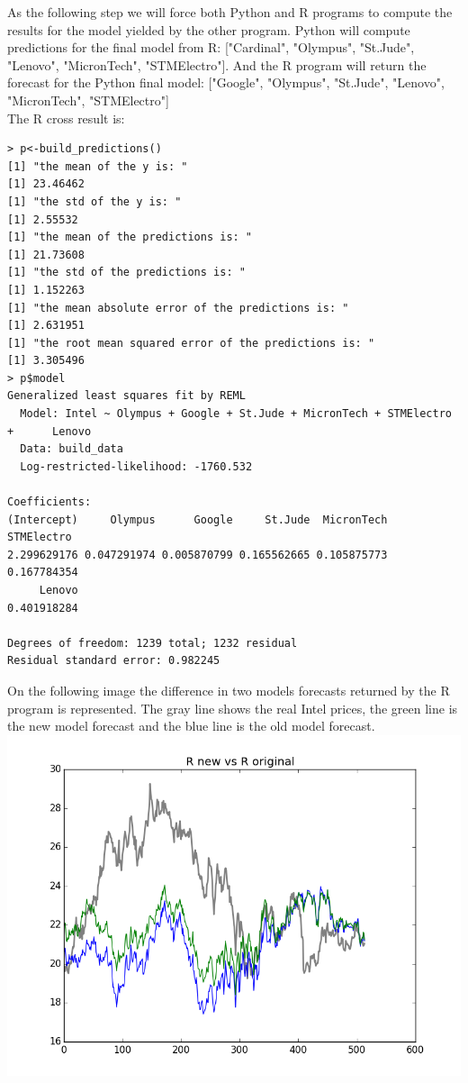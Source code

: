 \documentclass[
  twoside,
  12pt, a4paper,
  footinclude=true,
  headinclude=true,
  cleardoublepage=empty
]{article}
\begin{document}
As the following step we will force both Python and R programs to compute the results for the model yielded by the other program. Python will compute predictions for the final model from R: ["Cardinal", "Olympus", "St.Jude", "Lenovo", "MicronTech", "STMElectro"]. And the R program will return the forecast for the Python final model: ["Google", "Olympus", "St.Jude", "Lenovo", "MicronTech", "STMElectro"]\\
The R cross result is:
\begin{verbatim}
> p<-build_predictions()
[1] "the mean of the y is: "
[1] 23.46462
[1] "the std of the y is: "
[1] 2.55532
[1] "the mean of the predictions is: "
[1] 21.73608
[1] "the std of the predictions is: "
[1] 1.152263
[1] "the mean absolute error of the predictions is: "
[1] 2.631951
[1] "the root mean squared error of the predictions is: "
[1] 3.305496
> p$model
Generalized least squares fit by REML
  Model: Intel ~ Olympus + Google + St.Jude + MicronTech + STMElectro +      Lenovo 
  Data: build_data 
  Log-restricted-likelihood: -1760.532

Coefficients:
(Intercept)     Olympus      Google     St.Jude  MicronTech  STMElectro 
2.299629176 0.047291974 0.005870799 0.165562665 0.105875773 0.167784354 
     Lenovo 
0.401918284 

Degrees of freedom: 1239 total; 1232 residual
Residual standard error: 0.982245 
\end{verbatim}
On the following image the difference in two models forecasts returned by the R program is represented. The gray line shows the real Intel prices, the green line is the new model forecast and the blue line is the old model forecast.\\
\includegraphics[scale=0.75]{ROriginalVsNew.png}\\
\end{document}
